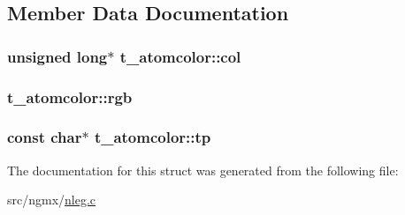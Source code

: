 \subsection{\-Member \-Data \-Documentation}
\hypertarget{structt__atomcolor_a3730bb71268ce0eefb90e4d7fac30cbb}{
\subsubsection[{col}]{\setlength{\rightskip}{0pt plus 5cm}unsigned long$\ast$ {\bf t\-\_\-atomcolor\-::col}}}\label{structt__atomcolor_a3730bb71268ce0eefb90e4d7fac30cbb}
\hypertarget{structt__atomcolor_a5bdaf69a9d6a9c8912f19764d6d7c8d8}{
\subsubsection[{rgb}]{ {\bf t\-\_\-atomcolor\-::rgb}}}\label{structt__atomcolor_a5bdaf69a9d6a9c8912f19764d6d7c8d8}
\hypertarget{structt__atomcolor_aada84a709c4cf2e9d5f4be1fdd29a747}{
\subsubsection[{tp}]{\setlength{\rightskip}{0pt plus 5cm}const char$\ast$ {\bf t\-\_\-atomcolor\-::tp}}}\label{structt__atomcolor_aada84a709c4cf2e9d5f4be1fdd29a747}


\-The documentation for this struct was generated from the following file\-:\begin{DoxyCompactItemize}
\item 
src/ngmx/\hyperlink{nleg_8c}{nleg.\-c}\end{DoxyCompactItemize}
